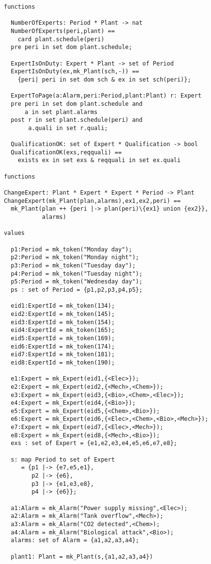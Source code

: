 \begin{lstlisting}
functions

  NumberOfExperts: Period * Plant -> nat
  NumberOfExperts(peri,plant) ==
    card plant.schedule(peri)
  pre peri in set dom plant.schedule;

  ExpertIsOnDuty: Expert * Plant -> set of Period
  ExpertIsOnDuty(ex,mk_Plant(sch,-)) ==
    {peri| peri in set dom sch & ex in set sch(peri)};

  ExpertToPage(a:Alarm,peri:Period,plant:Plant) r: Expert
  pre peri in set dom plant.schedule and
      a in set plant.alarms
  post r in set plant.schedule(peri) and
       a.quali in set r.quali;

  QualificationOK: set of Expert * Qualification -> bool
  QualificationOK(exs,reqquali) ==
    exists ex in set exs & reqquali in set ex.quali

functions

ChangeExpert: Plant * Expert * Expert * Period -> Plant
ChangeExpert(mk_Plant(plan,alarms),ex1,ex2,peri) ==
  mk_Plant(plan ++ {peri |-> plan(peri)\{ex1} union {ex2}},
           alarms)

values
 
  p1:Period = mk_token("Monday day");
  p2:Period = mk_token("Monday night");
  p3:Period = mk_token("Tuesday day");
  p4:Period = mk_token("Tuesday night");
  p5:Period = mk_token("Wednesday day");
  ps : set of Period = {p1,p2,p3,p4,p5};

  eid1:ExpertId = mk_token(134);
  eid2:ExpertId = mk_token(145);
  eid3:ExpertId = mk_token(154);
  eid4:ExpertId = mk_token(165);
  eid5:ExpertId = mk_token(169);
  eid6:ExpertId = mk_token(174);
  eid7:ExpertId = mk_token(181);
  eid8:ExpertId = mk_token(190);
  
  e1:Expert = mk_Expert(eid1,{<Elec>});
  e2:Expert = mk_Expert(eid2,{<Mech>,<Chem>});
  e3:Expert = mk_Expert(eid3,{<Bio>,<Chem>,<Elec>});
  e4:Expert = mk_Expert(eid4,{<Bio>});
  e5:Expert = mk_Expert(eid5,{<Chem>,<Bio>});
  e6:Expert = mk_Expert(eid6,{<Elec>,<Chem>,<Bio>,<Mech>});
  e7:Expert = mk_Expert(eid7,{<Elec>,<Mech>});
  e8:Expert = mk_Expert(eid8,{<Mech>,<Bio>});
  exs : set of Expert = {e1,e2,e3,e4,e5,e6,e7,e8};

  s: map Period to set of Expert
     = {p1 |-> {e7,e5,e1},
        p2 |-> {e6},
        p3 |-> {e1,e3,e8},
        p4 |-> {e6}};

  a1:Alarm = mk_Alarm("Power supply missing",<Elec>);
  a2:Alarm = mk_Alarm("Tank overflow",<Mech>);
  a3:Alarm = mk_Alarm("CO2 detected",<Chem>);
  a4:Alarm = mk_Alarm("Biological attack",<Bio>);
  alarms: set of Alarm = {a1,a2,a3,a4};

  plant1: Plant = mk_Plant(s,{a1,a2,a3,a4})
\end{lstlisting}  

